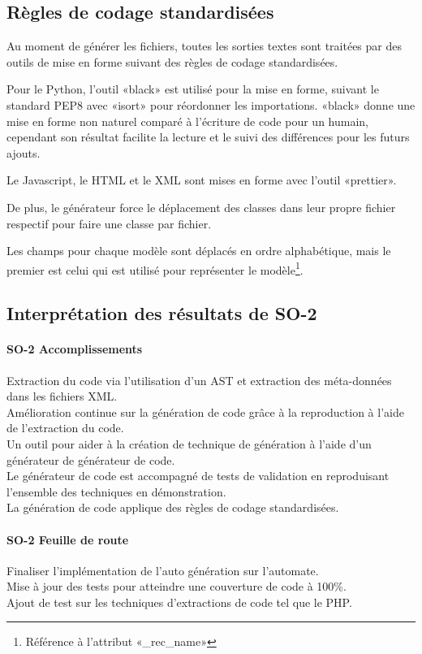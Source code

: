 \subsection {Règles de codage standardisées}

Au moment de générer les fichiers, toutes les sorties textes sont traitées par des outils de mise en forme suivant des règles de codage standardisées.

Pour le Python, l’outil «black» est utilisé pour la mise en forme, suivant le standard PEP8 avec «isort» pour réordonner les importations. «black» donne une mise en forme non naturel comparé à l’écriture de code pour un humain, cependant son résultat facilite la lecture et le suivi des différences pour les futurs ajouts.

Le Javascript, le HTML et le XML sont mises en forme avec l’outil «prettier».

De plus, le générateur force le déplacement des classes dans leur propre fichier respectif pour faire une classe par fichier.

Les champs pour chaque modèle sont déplacés en ordre alphabétique, mais le premier est celui qui est utilisé pour représenter le modèle\footnote{Référence à l'attribut «\_rec\_name»}.

\subsection{Interprétation des résultats de SO-2}

\paragraph{SO-2 Accomplissements}
Extraction du code via l’utilisation d’un AST et extraction des méta-données dans les fichiers XML.\\
Amélioration continue sur la génération de code grâce à la reproduction à l’aide de l’extraction du code.\\
Un outil pour aider à la création de technique de génération à l’aide d’un générateur de générateur de code.\\
Le générateur de code est accompagné de tests de validation en reproduisant l’ensemble des techniques en démonstration.\\
La génération de code applique des règles de codage standardisées.

\paragraph{SO-2 Feuille de route}
Finaliser l’implémentation de l'auto génération sur l’automate.\\
Mise à jour des tests pour atteindre une couverture de code à 100\%.\\
Ajout de test sur les techniques d’extractions de code tel que le PHP.

